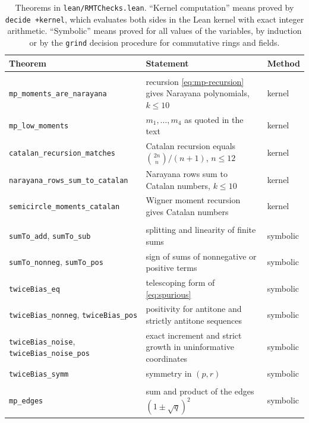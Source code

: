 \begin{table}[htbp]
\centering
\caption{Theorems in \texttt{lean/RMTChecks.lean}. ``Kernel computation'' means proved by \texttt{decide +kernel}, which evaluates both sides in the Lean kernel with exact integer arithmetic. ``Symbolic'' means proved for all values of the variables, by induction or by the \texttt{grind} decision procedure for commutative rings and fields.}
\label{tab:lean}
\small
\begin{tabular}{>{\raggedright}p{5.4cm}p{7.2cm}l}
\toprule
Theorem & Statement & Method\\
\midrule
\multicolumn{3}{l}{\emph{Moment combinatorics}}\\
\texttt{mp\_moments\_are\_narayana} & recursion \eqref{eq:mp-recursion} gives Narayana polynomials, $k\le10$ & kernel\\
\texttt{mp\_low\_moments} & $m_1,\ldots,m_4$ as quoted in the text & kernel\\
\texttt{catalan\_recursion\_matches} & Catalan recursion equals $\binom{2n}n/(n+1)$, $n\le12$ & kernel\\
\texttt{narayana\_rows\_sum\_}\newline\texttt{to\_catalan} & Narayana rows sum to Catalan numbers, $k\le10$ & kernel\\
\texttt{semicircle\_moments\_catalan} & Wigner moment recursion gives Catalan numbers & kernel\\
\midrule
\multicolumn{3}{l}{\emph{Spurious information}}\\
\texttt{sumTo\_add}, \newline\texttt{sumTo\_sub} & splitting and linearity of finite sums & symbolic\\
\texttt{sumTo\_nonneg}, \newline\texttt{sumTo\_pos} & sign of sums of nonnegative or positive terms & symbolic\\
\texttt{twiceBias\_eq} & telescoping form of \eqref{eq:spurious} & symbolic\\
\texttt{twiceBias\_nonneg}, \texttt{twiceBias\_pos} & positivity for antitone and strictly antitone sequences & symbolic\\
\texttt{twiceBias\_noise}, \texttt{twiceBias\_noise\_pos} & exact increment and strict growth in uninformative coordinates & symbolic\\
\texttt{twiceBias\_symm} & symmetry in $(p,r)$ & symbolic\\
\midrule
\multicolumn{3}{l}{\emph{Phase transitions}}\\
\texttt{mp\_edges} & sum and product of the edges $(1\pm\sqrt q)^2$ & symbolic\\

\end{tabular}
\end{table}
